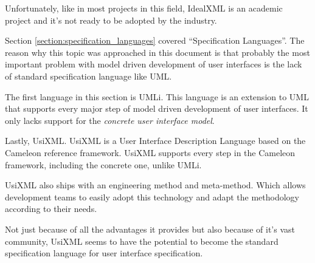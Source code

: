 Unfortunately, like in most projects in this field, IdealXML is an academic project and it's not ready to be adopted by the industry.

Section \ref{section:specification_languages} covered ``Specification Languages''. The reason why this topic was approached in this document is that probably the most important problem with model driven development of user interfaces is the lack of standard specification language like UML.

The first language in this section is UMLi\cite{User_Interface_Modeling_in_UMLi}. This language is an extension to UML that supports every major step of model driven development of user interfaces. It only lacks support for the \textit{concrete user interface model}.

Lastly, UsiXML\cite{UsiXML_a_Language_Supporting_Multi-Path_Development_of_User_Interfaces}. UsiXML is a User Interface Description Language based on the Cameleon reference framework\cite{Calvary}. UsiXML supports every step in the Cameleon framework, including the concrete one, unlike UMLi.

UsiXML also ships with an engineering method and meta-method. Which allows development teams to easily adopt this technology and adapt the methodology according to their needs.

Not just because of all the advantages it provides but also because of it's vast community, UsiXML seems to have the potential to become the standard specification language for user interface specification.